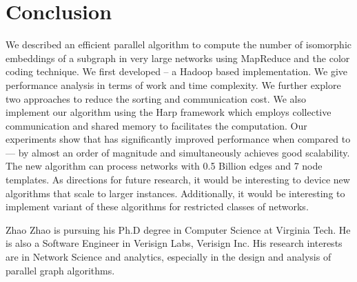 \section{Conclusion}
\label{conclusion}

We described an efficient parallel algorithm to compute the number of isomorphic
embeddings of a subgraph in very large networks using MapReduce and the color
coding technique.  We first developed \sahad{} -- a Hadoop based implementation.
We give performance analysis in terms of work and time complexity. We further
explore two approaches to reduce the sorting and communication cost. We also
implement our algorithm using the Harp framework which employs collective
communication and shared memory to facilitates the computation. Our experiments
show that \harpsahad{} has significantly improved performance when compared to
\sahad{} ---  by almost an order of magnitude and simultaneously achieves good
scalability. The new algorithm can process networks with 0.5 Billion edges and 7
node templates. As directions for future research, it would be interesting to
device new algorithms that scale to larger instances. Additionally, it would be
interesting to implement variant of these algorithms for restricted classes of
networks.




% 

\vspace{-1.5cm}

\begin{IEEEbiography}{Zhao Zhao}
is pursuing his Ph.D degree  in Computer Science at Virginia Tech. He is also  a
Software Engineer in Verisign Labs, Verisign Inc. His research interests are in
Network Science and analytics, especially in the design and analysis of parallel
graph algorithms.  \end{IEEEbiography}


